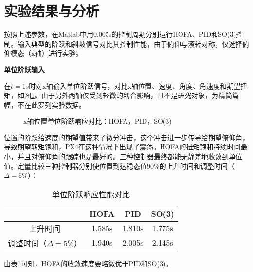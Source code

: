   \section{实验结果与分析}

  按照上述参数，在Matlab中用0.005s的控制周期分别运行HOFA、PID和SO(3)控制。输入典型的阶跃和斜坡信号对比其控制性能，由于俯仰与滚转对称，仅选择俯仰模态（x轴）进行实验。

  \textbf{单位阶跃输入}

  在$t=1s$时对x轴输入单位阶跃信号，对比x轴位置、速度、角度、角速度和期望扭矩，如图\ref{matlab_阶跃}。由于另外两轴仅受到轻微的耦合影响，且不是研究对象，为精简篇幅，不在此罗列实验数据。

  \begin{figure}[h]
    \centering
    \begin{minipage}[t]{0.33\textwidth}
      \centering
    \end{minipage}\hfill
    \begin{minipage}[t]{0.33\textwidth}
      \centering
    \end{minipage}\hfill
    \begin{minipage}[t]{0.33\textwidth}
      \centering
    \end{minipage}
    \caption{x轴位置单位阶跃响应对比：HOFA，PID，SO(3)}
    \label{matlab_阶跃}
\end{figure}

位置的阶跃给速度的期望值带来了微分冲击，这个冲击进一步传导给期望俯仰角，导致期望转矩饱和，PX4在这种情况下出现了震荡。HOFA的扭矩饱和持续时间最小，并且对俯仰角的跟踪也是最好的。三种控制器最终都能无静差地收敛到单位值。定量比较三种控制器分别使位置到达稳态值$90\%$的上升时间和调整时间（$\Delta = 5\%$）：


\begin{table}[h]
  \centering
  \begin{tabular}{cccc}
      \toprule
      & HOFA & PID & SO(3) \\
      \midrule
    上升时间 & 1.585s & 1.810s & 1.775s\\
    调整时间（$\Delta = 5\%$） & 1.940s & 2.005s &2.145s \\
      \bottomrule
  \end{tabular}
  \caption{单位阶跃响应性能对比}
  \label{matlab阶跃对比}
\end{table}
由表\ref{matlab阶跃对比}可知，HOFA的收敛速度要略微优于PID和SO(3)。

